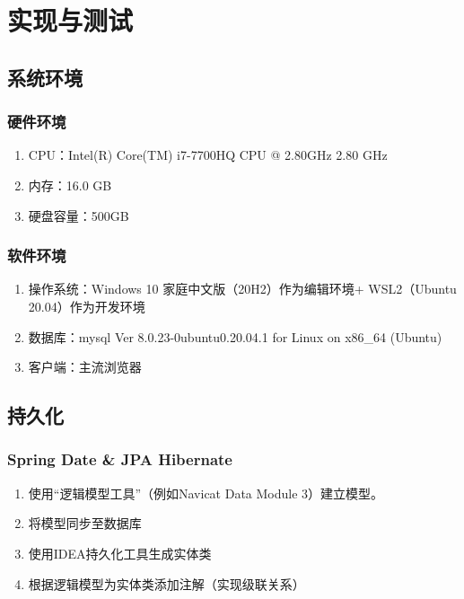 
\chapter{实现与测试}
\label{chap07}

\section{系统环境}

\subsection{硬件环境}

\begin{enumerate}
    \item CPU：Intel(R) Core(TM) i7-7700HQ CPU @ 2.80GHz   2.80 GHz
    \item 内存：16.0 GB
    \item 硬盘容量：500GB
\end{enumerate}

\subsection{软件环境}

\begin{enumerate}
    \item 操作系统：Windows 10 家庭中文版（20H2）作为编辑环境+ WSL2（Ubuntu 20.04）作为开发环境
    \item 数据库：mysql Ver 8.0.23-0ubuntu0.20.04.1 for Linux on x86\_64 (Ubuntu)
    \item 客户端：主流浏览器
\end{enumerate}


\section{持久化}
\subsection{Spring Date \& JPA Hibernate}

\begin{enumerate}
    \item 使用“逻辑模型工具”（例如Navicat Data Module 3）建立模型。
    \item 将模型同步至数据库
    \item 使用IDEA持久化工具生成实体类
    \item 根据逻辑模型为实体类添加注解（实现级联关系）
\end{enumerate}

